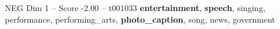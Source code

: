 \begin{textsample}{NEG Dim 1 – Score -2.00 – t001033}  \label{ex:f1_neg_024}
\textbf{entertainment}, \textbf{speech}, singing, performance, performing\_arts, \textbf{photo\_caption}, song, news, government

\end{textsample}
